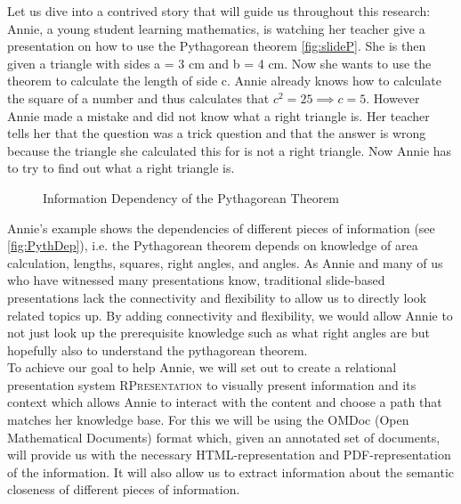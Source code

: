 \documentclass[twoside, 12pt]{article}
\newcommand{\sys}{\textsc{RPresentation}\xspace}
\begin{document}
Let us dive into a contrived story that will guide us throughout this research: Annie, a young student learning mathematics, is watching her teacher give a presentation on how to use the Pythagorean theorem \autoref{fig:slideP}. She is then given a triangle with sides a = 3 cm and b = 4 cm. Now she wants to use the theorem to calculate the length of side c. Annie already knows how to calculate the square of a number and thus calculates that $c^2 = 25 \implies c = 5$. However Annie made a mistake and did not know what a right triangle is. Her teacher tells her that the question was a trick question and that the answer is wrong because the triangle she calculated this for is not a right triangle. Now Annie has to try to find out what a right triangle is.\\

\begin{figure}
\vspace{-28pt}
  \begin{center}
  \end{center}
\vspace{-20pt}
  \caption{Information Dependency of the Pythagorean Theorem}
  \label{fig:deppyg}
\vspace{-10pt}
\end{figure}

Annie's example shows the dependencies of different pieces of information (see \autoref{fig:PythDep}), i.e. the Pythagorean theorem depends on knowledge of area calculation, lengths, squares, right angles, and angles. As Annie and many of us who have witnessed many presentations know, traditional slide-based presentations lack the connectivity and flexibility to allow us to directly look related topics up. By adding connectivity and flexibility, we would allow Annie to not just look up the prerequisite knowledge such as what right angles are but hopefully also to understand the pythagorean theorem.\\

To achieve our goal to help Annie, we will set out to create a relational presentation system \sys to visually present information and its context which allows Annie to interact with the content and choose a path that matches her knowledge base. For this we will be using the OMDoc (Open Mathematical Documents) format which, given an annotated set of documents, will provide us with the necessary HTML-representation and PDF-representation of the information. It will also allow us to extract information about the semantic closeness of different pieces of information.\\
\end{document}
